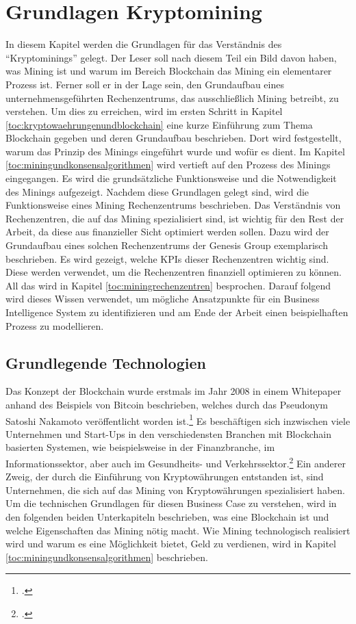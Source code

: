 \newpage
\section{Grundlagen Kryptomining} \label{toc:grundlagenkryptomining}


In diesem Kapitel werden die Grundlagen für das Verständnis des "`Kryptominings"' gelegt. Der Leser soll nach diesem Teil
ein Bild davon haben, was Mining ist und warum im Bereich Blockchain das Mining ein elementarer Prozess ist. Ferner soll
er in der Lage sein, den Grundaufbau eines unternehmensgeführten Rechenzentrums, das ausschließlich Mining betreibt, zu
verstehen. Um dies zu erreichen, wird im ersten Schritt in Kapitel \ref{toc:kryptowaehrungenundblockchain} eine kurze
Einführung zum Thema Blockchain gegeben und deren Grundaufbau beschrieben. Dort wird festgestellt, warum das Prinzip des
Minings eingeführt wurde und wofür es dient. Im Kapitel \ref{toc:miningundkonsensalgorithmen} wird vertieft auf den Prozess
des Minings eingegangen. Es wird die grundsätzliche Funktionsweise und die Notwendigkeit des Minings aufgezeigt. Nachdem
diese Grundlagen gelegt sind, wird die Funktionsweise eines Mining Rechenzentrums beschrieben. Das Verständnis von
Rechenzentren, die auf das Mining spezialisiert sind, ist wichtig für den Rest der Arbeit, da diese aus finanzieller
Sicht optimiert werden sollen. Dazu wird der Grundaufbau eines solchen Rechenzentrums der Genesis Group exemplarisch
beschrieben. Es wird gezeigt, welche \acp{KPI} dieser Rechenzentren wichtig sind. Diese werden verwendet, um die
Rechenzentren finanziell optimieren zu können. All das wird in Kapitel \ref{toc:miningrechenzentren} besprochen. Darauf
folgend wird dieses Wissen verwendet, um mögliche Ansatzpunkte für ein Business Intelligence System zu identifizieren
und am Ende der Arbeit einen beispielhaften Prozess zu modellieren.

\subsection{Grundlegende Technologien} \label{toc:technologie}

Das Konzept der Blockchain wurde erstmals im Jahr 2008 in einem Whitepaper anhand des Beispiels von Bitcoin beschrieben,
welches durch das Pseudonym Satoshi Nakamoto veröffentlicht worden ist.\footcite[Vgl.][]{nakamoto2008bitcoin} Es
beschäftigen sich inzwischen viele Unternehmen und Start-Ups in den verschiedensten Branchen mit Blockchain basierten
Systemen, wie beispielsweise in der Finanzbranche, im Informationssektor, aber auch im Gesundheits- und
Verkehrssektor.\footcite[Vgl.][Kap. 4.1]{friedlmaier2018disrupting} Ein anderer Zweig, der durch die Einführung von
Kryptowährungen entstanden ist, sind Unternehmen, die sich auf das Mining von Kryptowährungen spezialisiert haben. Um die
technischen Grundlagen für diesen Business Case zu verstehen, wird in den folgenden beiden Unterkapiteln beschrieben, was
eine Blockchain ist und welche Eigenschaften das Mining nötig macht. Wie Mining technologisch realisiert wird und warum
es eine Möglichkeit bietet, Geld zu verdienen, wird in Kapitel \ref{toc:miningundkonsensalgorithmen} beschrieben.

